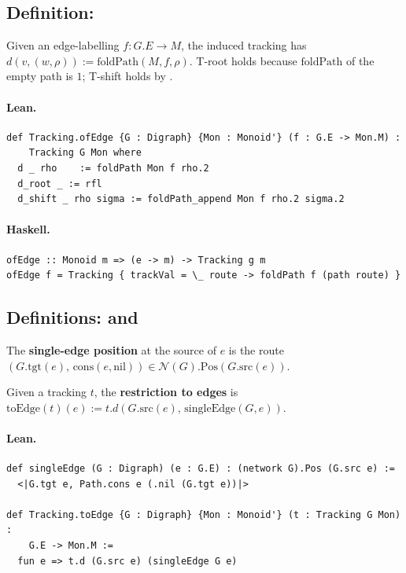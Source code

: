 \documentclass[11pt,a4paper]{article}
\begin{document}
\subsection{Definition: }

\begin{defn}
Given an edge-labelling $f : G.E \to M$, the induced tracking has
$d(v, (w, \rho)) := \mathrm{foldPath}(M, f, \rho)$.  T-root holds because
$\mathrm{foldPath}$ of the empty path is $1$; T-shift holds by
.
\end{defn}

\paragraph{Lean.}
\begin{lstlisting}[style=lean]
def Tracking.ofEdge {G : Digraph} {Mon : Monoid'} (f : G.E -> Mon.M) :
    Tracking G Mon where
  d _ rho    := foldPath Mon f rho.2
  d_root _ := rfl
  d_shift _ rho sigma := foldPath_append Mon f rho.2 sigma.2
\end{lstlisting}

\paragraph{Haskell.}
\begin{lstlisting}[style=haskell]
ofEdge :: Monoid m => (e -> m) -> Tracking g m
ofEdge f = Tracking { trackVal = \_ route -> foldPath f (path route) }
\end{lstlisting}


\subsection{Definitions:  and }

\begin{defn}
The \textbf{single-edge position} at the source of $e$ is the route
$(G.\mathrm{tgt}(e),\, \mathrm{cons}(e, \mathrm{nil}))
\in \mathcal{N}(G).\mathrm{Pos}(G.\mathrm{src}(e))$.

Given a tracking $t$, the \textbf{restriction to edges} is
$\mathrm{toEdge}(t)(e) := t.d(G.\mathrm{src}(e),\, \mathrm{singleEdge}(G, e))$.
\end{defn}

\paragraph{Lean.}
\begin{lstlisting}[style=lean]
def singleEdge (G : Digraph) (e : G.E) : (network G).Pos (G.src e) :=
  <|G.tgt e, Path.cons e (.nil (G.tgt e))|>

def Tracking.toEdge {G : Digraph} {Mon : Monoid'} (t : Tracking G Mon) :
    G.E -> Mon.M :=
  fun e => t.d (G.src e) (singleEdge G e)
\end{lstlisting}
\end{document}

